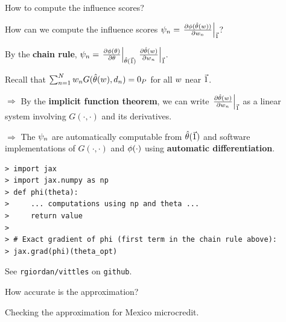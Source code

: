 \begin{frame}[fragile]{How to compute the influence scores?}

How can we compute the influence scores
%
%
$
\infl_n =
\fracat{\partial \thetafun(\thetahat(\w))}
       {\partial\w_n}{\onevec}
%
$?
%

\pause
\vspace{1em}
By the \textbf{chain rule},
$
\infl_n =
\fracat{\partial \thetafun(\theta)}
      {\partial\theta}{\thetahat(\onevec)}
\fracat{\partial \thetahat(\w)}
    {\partial\w_n}{\onevec}
%
$.

\pause
\vspace{1em}
Recall that
$\sum_{n=1}^N w_n G(\hat{\theta}(w), d_{n}) =  0_{P}$ for all $w$ near $\vec{1}$.

\vspace{1em}
$\Rightarrow$
By the \textbf{implicit function theorem}, we can write
$\left.\frac{\partial\hat{\theta}(w)}{\partial w_n}\right|_{\vec{1}}$ as a linear system
involving $G(\cdot, \cdot)$ and its derivatives.

\pause
\vspace{1em}
$\Rightarrow$
The $\psi_n$ are automatically computable from $\hat{\theta}(\vec{1})$ and
software implementations of $G(\cdot, \cdot)$ and $\phi(\cdot)$
using \textbf{automatic differentiation}.

\begin{lstlisting}
> import jax
> import jax.numpy as np
> def phi(theta):
>     ... computations using np and theta ...
>     return value
>
> # Exact gradient of phi (first term in the chain rule above):
> jax.grad(phi)(theta_opt)
\end{lstlisting}

See \texttt{rgiordan/vittles} on \texttt{github}.

\end{frame}



\begin{frame}{How accurate is the approximation?}



\begin{center}
Checking the approximation for Mexico microcredit.
\end{center}


\end{frame}


